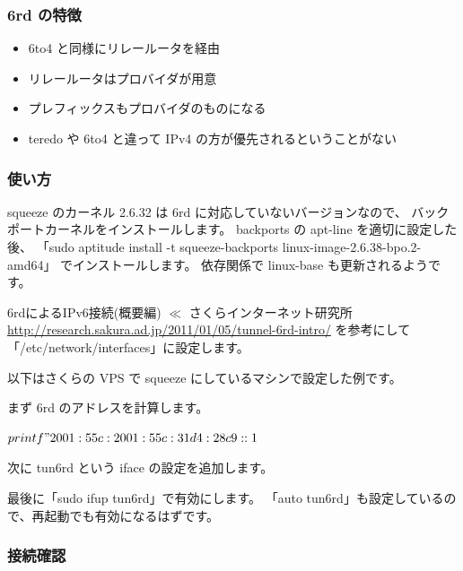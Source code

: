 \documentclass[mingoth,a4paper]{jsarticle}
\begin{document}
\subsubsection{6rd の特徴}


\begin{itemize}
\item 6to4 と同様にリレールータを経由
\item リレールータはプロバイダが用意
\item プレフィックスもプロバイダのものになる
\item teredo や 6to4 と違って IPv4 の方が優先されるということがない
\end{itemize}
\subsubsection{使い方}


squeeze のカーネル 2.6.32 は 6rd に対応していないバージョンなので、
バックポートカーネルをインストールします。
backports の apt-line を適切に設定した後、
「sudo aptitude install -t squeeze-backports linux-image-2.6.38-bpo.2-amd64」
でインストールします。
依存関係で linux-base も更新されるようです。

6rdによるIPv6接続(概要編) $\ll$ さくらインターネット研究所
\url{http://research.sakura.ad.jp/2011/01/05/tunnel-6rd-intro/}
を参考にして「/etc/network/interfaces」に設定します。

以下はさくらの VPS で squeeze にしているマシンで設定した例です。

まず 6rd のアドレスを計算します。

\begin{commandline}
$ printf "2001:55c:%
2001:55c:31d4:28c9::1
$
\end{commandline}

次に tun6rd という iface の設定を追加します。


最後に「sudo ifup tun6rd」で有効にします。
「auto tun6rd」も設定しているので、再起動でも有効になるはずです。
\subsubsection{接続確認}
\end{document}
